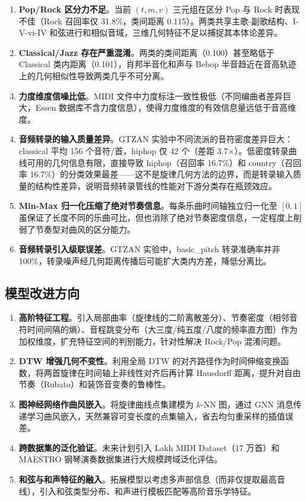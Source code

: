 \documentclass[withoutpreface]{cumcmthesis}
\begin{document}
\begin{enumerate}[label=(\arabic*),leftmargin=2em]
    \item \textbf{Pop/Rock 区分力不足}。当前 $(t, m, v)$ 三元组在区分 Pop 与 Rock 时表现不佳（Rock 召回率仅 31.8\%，类间距离 0.115）。两类共享主歌-副歌结构、I-V-vi-IV 和弦进行和相似音域，三维几何特征不足以捕捉其本体论差异。
    \item \textbf{Classical/Jazz 存在严重混淆}。两类的类间距离（0.100）甚至略低于 Classical 类内距离（0.101），肖邦半音化和声与 Bebop 半音趋近在音高轨迹上的几何相似性导致两类几乎不可分离。
    \item \textbf{力度维度信噪比低}。MIDI 文件中力度标注一致性极低（不同编曲者差异巨大，Essen 数据库不含力度信息），使得力度维度的有效信息量远低于音高维度。
    \item \textbf{音频转录的输入质量差异}。GTZAN 实验中不同流派的音符密度差异巨大：classical 平均 156 个音符/首，hiphop 仅 42 个（差距 3.7$\times$）。低密度转录曲线可用的几何信息有限，直接导致 hiphop（召回率 16.7\%）和 country（召回率 16.7\%）的分类效果最差——这不是旋律几何方法的边界，而是转录输入质量的结构性差异，说明音频转录管线的性能对下游分类存在瓶颈效应。
    \item \textbf{Min-Max 归一化压缩了绝对节奏信息}。每条乐曲时间轴独立归一化至 $[0,1]$ 虽保证了长度不同的乐曲可比，但也消除了绝对节奏密度信息，一定程度上削弱了节奏型对曲风的区分能力。
    \item \textbf{音频转录引入级联误差}。GTZAN 实验中，basic\_pitch 转录准确率并非 100\%，转录噪声经几何距离传播后可能扩大类内方差，降低分离比。
\end{enumerate}

\subsection{模型改进方向}

\begin{enumerate}[label=(\arabic*),leftmargin=2em]
    \item \textbf{高阶特征工程}。引入局部曲率（旋律线的二阶离散差分）、节奏密度（相邻音符时间间隔的熵）、音程跳变分布（大三度/纯五度/八度的频率直方图）作为加权维度，扩充特征空间的判别能力，针对性解决 Rock/Pop 混淆问题。
    \item \textbf{DTW 增强几何不变性}。利用全局 DTW 的对齐路径作为时间伸缩变换函数，将两首旋律在时间轴上非线性对齐后再计算 Hausdorff 距离，提升对自由节奏（Rubato）和装饰音变奏的鲁棒性。
    \item \textbf{图神经网络作曲风嵌入}。将旋律曲线点集建模为 $k$-NN 图，通过 GNN 消息传递学习曲风嵌入，天然兼容可变长度的点集输入，省去均匀重采样的插值误差。
    \item \textbf{跨数据集的泛化验证}。未来计划引入 Lakh MIDI Dataset（17 万首）和 MAESTRO 钢琴演奏数据集进行大规模跨域泛化评估。
    \item \textbf{和弦与和声特征的融入}。拓展模型以考虑多声部信息（而非仅提取最高音线），引入和弦类型分布、和声进行模板匹配等高阶音乐学特征。
\end{enumerate}
\end{document}
